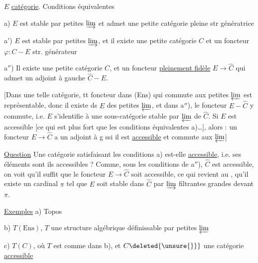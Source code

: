 $E$ \uline{catégorie}. Conditions équivalentes

a)  $E$ est stable par petites $\varinjlim$ et admet une petite catégorie pleine str génératrice

a$'$) $E$ est stable par petites $\varinjlim$, et il existe une petite catégorie $C$ et un foncteur $\varphi:C\mathbin{-}E$ str. générateur

a$''$) Il existe une petite catégorie $C$, et un foncteur \uline{pleinement fidèle} $E\to\widehat C$ qui admet un adjoint à gauche $\widehat C\mathbin{-}E$.

[Dans une telle catégorie, tt foncteur  dans (Ens) qui commute aux petites $\varprojlim$ est représentable, donc il existe ds $E$ des petites $\varprojlim$, et dans a$''$), le foncteur $E\mathbin{-}\widehat C$ y commute, i.e. $E$ s'identifie à une sous-catégorie stable par $\varprojlim$ de $\widehat C$. Si $E$ est accessible [ce qui est plus fort que les conditions équivalentes a)\ldots], alors :  un foncteur $E\to\widehat C$ a un adjoint à g ssi il est \uline{accessible} et commute aux  $\varprojlim$]

 \uline{Question} Une catégorie satisfaisant les conditions a) est-elle \uline{accessible}, i.e. ses éléments sont ils accessibles ? Comme, sous les conditions de a$''$), $\widehat C$ est accessible, on voit qu'il  suffit que le foncteur $E\to\widehat C$ soit accessible,  ce qui revient au , qu'il existe un cardinal $\pi$ tel que $E$ soit stable dans $\widehat C$ par $\varinjlim$ filtrantes grandes devant $\pi$.


\uline{Exemples} a) Topos  

b) $T(\mathrm{Ens})$, $T$ une structure algébrique définissable par petites $\varprojlim$

c) $T(C)$, où $T$ est comme dans b), et $C\deleted{\unsure{\}}}$ une catégorie \uline{accessible}


